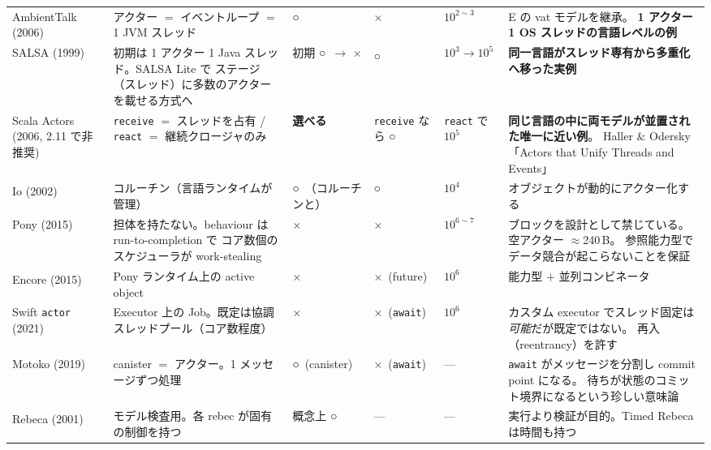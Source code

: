 \documentclass[11pt,a4paper]{ltjsarticle}
\newcommand{\dg}{\textsuperscript{\dag}}
\newcommand{\yes}{\textbf{○}}
\newcommand{\no}{×}
\begin{document}
\begin{landscape}
\begin{longtable}{@{}p{3.3cm}p{4.6cm}>{\raggedright\arraybackslash}p{2.5cm}>{\raggedright\arraybackslash}p{2.6cm}>{\raggedright\arraybackslash}p{1.5cm}p{6.0cm}@{}}
AmbientTalk (2006)
  & アクター $=$ イベントループ $=$ 1 JVM スレッド
  & \yes
  & \no
  & $10^{2\sim3}$
  & E の vat モデルを継承。
    \textbf{1 アクター 1 OS スレッドの言語レベルの例} \\

SALSA (1999)
  & 初期は 1 アクター 1 Java スレッド。SALSA Lite で
    ステージ（スレッド）に多数のアクターを載せる方式へ
  & 初期 \yes\ $\rightarrow$ \no
  & \yes\dg
  & $10^{3}\rightarrow10^{5}$
  & \textbf{同一言語がスレッド専有から多重化へ移った実例} \\

Scala Actors (2006, 2.11 で非推奨)
  & \texttt{receive} $=$ スレッドを占有 /
    \texttt{react} $=$ 継続クロージャのみ
  & \textbf{選べる}
  & \texttt{receive} なら \yes
  & \texttt{react} で $10^{5}$
  & \textbf{同じ言語の中に両モデルが並置された唯一に近い例}。
    Haller \& Odersky「Actors that Unify Threads and Events」 \\

Io (2002)\dg
  & コルーチン（言語ランタイムが管理）
  & \yes\ （コルーチンと）
  & \yes
  & $10^{4}$
  & オブジェクトが動的にアクター化する \\

Pony (2015)
  & 担体を持たない。behaviour は run-to-completion で
    コア数個のスケジューラが work-stealing
  & \no
  & \no
  & $10^{6\sim7}$
  & ブロックを設計として禁じている。空アクター $\approx$240\,B。
    参照能力型でデータ競合が起こらないことを保証 \\

Encore (2015)\dg
  & Pony ランタイム上の active object
  & \no
  & \no\ (future)
  & $10^{6}$
  & 能力型 $+$ 並列コンビネータ \\

Swift \texttt{actor} (2021)
  & Executor 上の Job。既定は協調スレッドプール（コア数程度）
  & \no
  & \no\ (\texttt{await})
  & $10^{6}$
  & カスタム executor でスレッド固定は\emph{可能}だが既定ではない。
    再入（reentrancy）を許す \\

Motoko (2019)
  & canister $=$ アクター。1 メッセージずつ処理
  & \yes\ (canister)
  & \no\ (\texttt{await})
  & ---
  & \texttt{await} がメッセージを分割し commit point になる。
    待ちが状態のコミット境界になるという珍しい意味論 \\

Rebeca (2001)\dg
  & モデル検査用。各 rebec が固有の制御を持つ
  & 概念上 \yes
  & ---
  & ---
  & 実行より検証が目的。Timed Rebeca は時間も持つ \\


\end{longtable}
\end{landscape}
\end{document}
